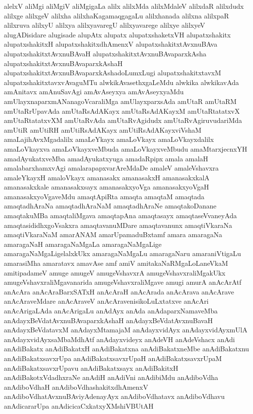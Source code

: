 {alelxV
aliMgi
aliMgiV
aliMgigaLa
alilx
alilxMda
alilxMdaleV
alilxdaR
alilxdudx
alilxge
alilxgeV
alilxha
alilxhaKagamaqgagaLu
alilxhanada
alilxna
alilxpaR
alilxruva
alilxyU
alilxya
alilxyavaregU
alilxyavarege
alilxye
alilxyeV
alugADisidare
alugisade
alupAtx
alupatx
alupatxshaketxVH
alupatxshakitx
alupatxshakitxH
alupatxshakitxdhAmenxV
alupatxshakitxtAvxnuBAva
alupatxshakitxtAvxnuBAvaH
alupatxshakitxtAvxnuBAvaparxkAsha
alupatxshakitxtAvxnuBAvaparxkAshaH
alupatxshakitxtAvxnuBAvaparxkAshadoLumxLugi
alupatxshakitxtavxM
alupatxshakitxtavxvAvaguMTu
alwkikAvasethxgaLeMdu
alwkika
alwkikavAda
amAnitavx
amAnuSavAgi
amAvAseyxya
amAvAseyxyaMdu
amUlayxnaparxmANanagoVcaraliMga
amUlayxparxsAda
amUtaR
amUtaRM
amUtaRrUpavAda
amUtaRsAdAKayx
amUtaRsAdAKayxM
amUtaRtatatxvX
amUtaRtatatxvXM
amUtaRvAda
amUtaRvAgidudx
amUtaRvAgiruvudariMda
amUtiR
amUtiRH
amUtiRsAdAKayx
amUtiRsAdAKayxviVshaM
amaLajihAvxMgadalilx
amaLeYkayx
amaLoVkayx
amaLoVkayxdalilx
amaLoVkayxva
amaLoVkayxveMbuda
amaLoVkayxveMbudu
amaMtarxjecnxYH
amadAyukatxveMba
amadAyukatxyuga
amadaRpipx
amala
amalaH
amalabarxhamxvAgi
amalarapapxvarAreMdaDe
amaleV
amaleVshavxra
amaleYkayxH
amaloVkayx
amanasakx
amanasakxH
amanasakxkalA
amanasakxkale
amanasakxsayx
amanasakxyoVga
amanasakxyoVgaH
amanasakxyoVgaveMdu
amaqtApiRta
amaqta
amaqtaM
amaqtada
amaqtadhAraNa
amaqtadhAraNaM
amaqtadhAraNe
amaqtakoDanane
amaqtakuMBa
amaqtaliMgava
amaqtapAna
amaqtasayx
amaqtaseVvaneyAda
amaqtasididhxgoVsakxra
amaqtavanuMDare
amaqtavanunx
amaqtiVkaraNa
amaqtiVkaraNaM
amarANAM
amarUpamaduBxtamf
amara
amaragaNa
amaragaNaH
amaragaNaMgaLa
amaragaNaMgaLige
amaragaNaMgaLigelalxkUkx
amaragaNaMgaLu
amaragaNaru
amaraniVtigaLu
amarasiMha
amaratavx
amavAse
amf
amiV
amitakaNaRMgaLoLaneVkaM
amitipadameV
amuge
amugeV
amugeVshavxrA
amugeVshavxraliMgakUkx
amugeVshavxraliMgavanarida
amugeVshavxraliMgave
amugi
amurA
anAcArAtf
anAcAra
anAcAraBarxSATxH
anAcAraH
anAcArada
anAcArava
anAcArave
anAcAraveMdare
anAcAraveV
anAcAravenisikoLuLxtatxve
anAcAri
anAcArigaLAda
anAcArigaLu
anAdAyx
anAda
anAdaparxNamaveMba
anAdayxBeVdatAvxnuBAvaparxkAshaH
anAdayxBeVdatAvxnuBavaH
anAdayxBeVdatavxM
anAdayxMtamajaM
anAdayxvidAyx
anAdayxvidAyxmUlA
anAdayxvidAyxsaMbaMdhAtf
anAdayxvideyx
anAdeVH
anAdeVshacx
anAdi
anAdiBakatx
anAdiBakatxH
anAdiBakatxna
anAdiBakatxneMbe
anAdiBakatxnu
anAdiBakatxsavxrUpa
anAdiBakatxsavxrUpaH
anAdiBakatxsavxrUpaM
anAdiBakatxsavxrUpavu
anAdiBakatxsayx
anAdiBakitxH
anAdiBakotxVdadhxraNe
anAdiH
anAdiVni
anAdibiMdu
anAdiboVdha
anAdiboVdhaH
anAdiboVdhashakitxdhAmenxV
anAdiboVdhatAvxnuBAviyAdenayAyx
anAdiboVdhatavx
anAdiboVdhavu
anAdicararUpa
anAdicicaCxkatxyXMshiVBUtAH
}
